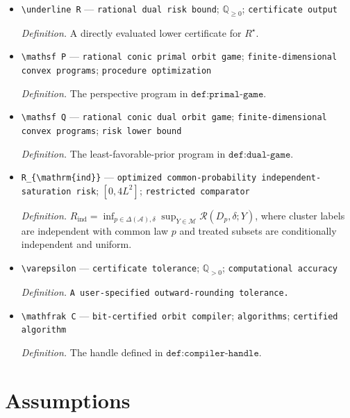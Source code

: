 \documentclass{article}
\begin{document}
\begin{itemize}
  \par\smallskip\noindent\emph{Definition.} A directly evaluated upper certificate for \(R^\star\).
  \item \texttt{\textbackslash{}\allowbreak{}underline R} --- \texttt{rational dual risk bound}; \(\mathbb Q_{\ge0}\); \texttt{certificate output}
  \par\smallskip\noindent\emph{Definition.} A directly evaluated lower certificate for \(R^\star\).
  \item \texttt{\textbackslash{}\allowbreak{}mathsf P} --- \texttt{rational conic primal orbit game}; \texttt{finite-\allowbreak{}dimensional convex programs}; \texttt{procedure optimization}
  \par\smallskip\noindent\emph{Definition.} The perspective program in \(\texttt{def:primal-game}\).
  \item \texttt{\textbackslash{}\allowbreak{}mathsf Q} --- \texttt{rational conic dual orbit game}; \texttt{finite-\allowbreak{}dimensional convex programs}; \texttt{risk lower bound}
  \par\smallskip\noindent\emph{Definition.} The least-favorable-prior program in \(\texttt{def:dual-game}\).
  \item \texttt{R\_\allowbreak{}\{\textbackslash{}\allowbreak{}mathrm\{ind\}\allowbreak{}\}\allowbreak{}} --- \texttt{optimized common-\allowbreak{}probability independent-\allowbreak{}saturation risk}; \([0,4L^2]\); \texttt{restricted comparator}
  \par\smallskip\noindent\emph{Definition.} \(R_{\mathrm{ind}}=\inf_{p\in\Delta(\mathcal A),\delta}\sup_{Y\in\mathcal M}\mathcal R(D_p,\delta;Y)\), where cluster labels are independent with common law \(p\) and treated subsets are conditionally independent and uniform.
  \item \texttt{\textbackslash{}\allowbreak{}varepsilon} --- \texttt{certificate tolerance}; \(\mathbb Q_{>0}\); \texttt{computational accuracy}
  \par\smallskip\noindent\emph{Definition.} \texttt{A user-\allowbreak{}specified outward-\allowbreak{}rounding tolerance.}
  \item \texttt{\textbackslash{}\allowbreak{}mathfrak C} --- \texttt{bit-\allowbreak{}certified orbit compiler}; \texttt{algorithms}; \texttt{certified algorithm}
  \par\smallskip\noindent\emph{Definition.} The handle defined in \(\texttt{def:compiler-handle}\).
\end{itemize}

\section{Assumptions}
\end{document}

